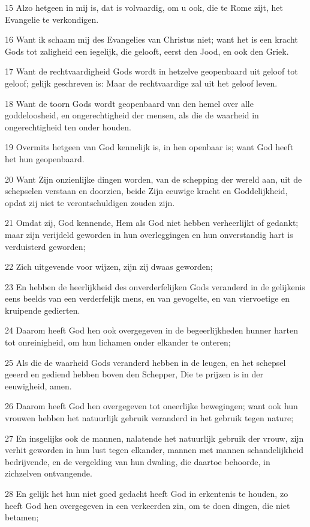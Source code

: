 \par 15 Alzo hetgeen in mij is, dat is volvaardig, om u ook, die te Rome zijt, het Evangelie te verkondigen.
\par 16 Want ik schaam mij des Evangelies van Christus niet; want het is een kracht Gods tot zaligheid een iegelijk, die gelooft, eerst den Jood, en ook den Griek.
\par 17 Want de rechtvaardigheid Gods wordt in hetzelve geopenbaard uit geloof tot geloof; gelijk geschreven is: Maar de rechtvaardige zal uit het geloof leven.
\par 18 Want de toorn Gods wordt geopenbaard van den hemel over alle goddeloosheid, en ongerechtigheid der mensen, als die de waarheid in ongerechtigheid ten onder houden.
\par 19 Overmits hetgeen van God kennelijk is, in hen openbaar is; want God heeft het hun geopenbaard.
\par 20 Want Zijn onzienlijke dingen worden, van de schepping der wereld aan, uit de schepselen verstaan en doorzien, beide Zijn eeuwige kracht en Goddelijkheid, opdat zij niet te verontschuldigen zouden zijn.
\par 21 Omdat zij, God kennende, Hem als God niet hebben verheerlijkt of gedankt; maar zijn verijdeld geworden in hun overleggingen en hun onverstandig hart is verduisterd geworden;
\par 22 Zich uitgevende voor wijzen, zijn zij dwaas geworden;
\par 23 En hebben de heerlijkheid des onverderfelijken Gods veranderd in de gelijkenis eens beelds van een verderfelijk mens, en van gevogelte, en van viervoetige en kruipende gedierten.
\par 24 Daarom heeft God hen ook overgegeven in de begeerlijkheden hunner harten tot onreinigheid, om hun lichamen onder elkander te onteren;
\par 25 Als die de waarheid Gods veranderd hebben in de leugen, en het schepsel geeerd en gediend hebben boven den Schepper, Die te prijzen is in der eeuwigheid, amen.
\par 26 Daarom heeft God hen overgegeven tot oneerlijke bewegingen; want ook hun vrouwen hebben het natuurlijk gebruik veranderd in het gebruik tegen nature;
\par 27 En insgelijks ook de mannen, nalatende het natuurlijk gebruik der vrouw, zijn verhit geworden in hun lust tegen elkander, mannen met mannen schandelijkheid bedrijvende, en de vergelding van hun dwaling, die daartoe behoorde, in zichzelven ontvangende.
\par 28 En gelijk het hun niet goed gedacht heeft God in erkentenis te houden, zo heeft God hen overgegeven in een verkeerden zin, om te doen dingen, die niet betamen;
